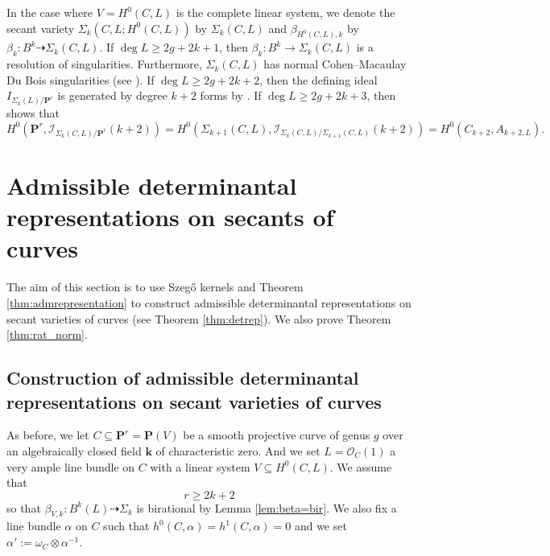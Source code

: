 \documentclass[12pt]{amsart}
\numberwithin{equation}{section}
\numberwithin{thmcounter}{section}
\theoremstyle{definition}
\theoremstyle{claim}
\newcommand{\kk}{\mathbf{k}}
\newcommand{\nP}{\mathbf{P}}
\newcommand{\sO}{\mathscr{O}}
\newcommand{\sI}{\mathscr{I}}
\begin{document}
In the case where $V=H^0(C,L)$ is the complete linear system, we denote the secant variety $\Sigma_k(C,L;H^0(C,L))$ by $\Sigma_k(C,L)$ and  $\beta_{H^0(C,L),k}$  by $\beta_{k}\colon B^k \dashrightarrow \Sigma_k(C,L)$. If $\deg L \geq 2g+2k+1$, then $\beta_{k}\colon B^k \to \Sigma_k(C,L)$ is a resolution of singularities. Furthermore, $\Sigma_k(C,L)$ has normal Cohen--Macaulay Du Bois singularities (see \cite[Theorem 1.1]{ENP}). If $\deg L \geq 2g+2k+2$, then the defining ideal $I_{\Sigma_k(L)/\nP^r}$ is generated by degree $k+2$ forms by \cite[Theorem 1.2]{ENP}. If $\deg L \geq 2g+2k+3$, then \cite[Theorem 5.2]{ENP} shows   that
$$
H^0(\nP^r, \sI_{\Sigma_k(C,L)/\nP^r}(k+2)) = H^0(\Sigma_{k+1}(C,L), \sI_{\Sigma_k(C,L)/\Sigma_{k+1}(C,L)}(k+2))=H^0(C_{k+2}, A_{k+2,L}).
$$






\section{Admissible determinantal representations on secants of curves}\label{sec:constdetrep}
\noindent The aim of this section is to use Szeg\H{o} kernels and Theorem \ref{thm:admrepresentation} to construct admissible determinantal representations on secant varieties of curves (see Theorem \ref{thm:detrep}). We also prove Theorem \ref{thm:rat_norm}. 


\subsection{Construction of admissible determinantal representations on secant varieties of curves}
As before, we let $C \subseteq \nP^r = \nP(V)$ be a smooth projective curve of genus $g$ over an algebraically closed field $\kk$ of characteristic zero. And we set $L = \sO_C(1)$ a very ample line bundle on $C$ with a linear system $V\subseteq H^0(C,L)$. We assume that
$$
r\geq 2k+2
$$
so that  $\beta_{V,k} \colon B^k(L) \dashrightarrow \Sigma_k$ is birational by Lemma \ref{lem:beta=bir}. We also fix a  line bundle $\alpha$ on $C$ such that $h^0(C,\alpha)=h^1(C,\alpha)=0$ and we set $\alpha':=\omega_C\otimes \alpha^{-1}$.
\medskip
\end{document}
